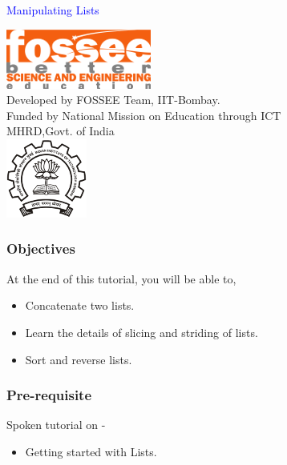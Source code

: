 \documentclass[presentation]{beamer}
\title{}
\author{FOSSEE}
\date{}
\begin{document}
\begin{frame}

\begin{center}
\vspace{12pt}
\textcolor{blue}{\huge Manipulating Lists}
\end{center}
\vspace{18pt}
\begin{center}
\vspace{10pt}
\includegraphics[scale=0.95]{../images/fossee-logo.png}\\
\vspace{5pt}
\scriptsize Developed by FOSSEE Team, IIT-Bombay. \\ 
\scriptsize Funded by National Mission on Education through ICT\\
\scriptsize  MHRD,Govt. of India\\
\includegraphics[scale=0.30]{../images/iitb-logo.png}\\
\end{center}
\end{frame}
\begin{frame}
\frametitle{Objectives}
\label{sec-2}

  At the end of this tutorial, you will be able to,


\begin{itemize}
\item Concatenate two lists.
\item Learn the details of slicing and striding of lists.
\item Sort and reverse lists.
\end{itemize}
\end{frame}
\begin{frame}
\frametitle{Pre-requisite}
\label{sec-3}

Spoken tutorial on -

\begin{itemize}
\item Getting started with Lists.
\end{itemize}
\end{frame}
\end{document}
